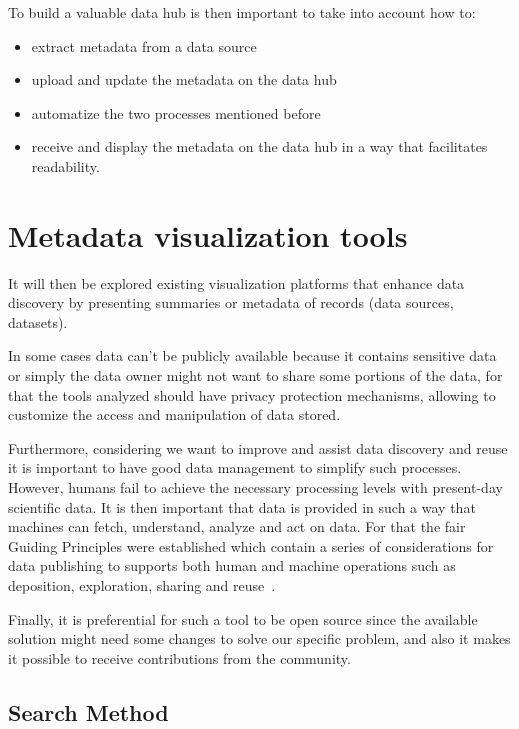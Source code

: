 To build a valuable data hub is then important to take into account how to:
\begin{itemize}
    \item extract metadata from a data source
    \item upload and update the metadata on the data hub
    \item automatize the two processes mentioned before
    \item receive and display the metadata on the data hub in a way that facilitates
        readability.
\end{itemize}

\section{Metadata visualization tools}
%
%


It will then be explored existing visualization platforms that enhance data discovery
by presenting summaries or metadata of records (data sources, datasets).

In some cases data can't be publicly available because it contains sensitive data or
simply the data owner might not want to share some portions of the data, for that the
tools analyzed should have privacy protection mechanisms, allowing to customize the
access and manipulation of data stored.

Furthermore, considering we want to improve and assist data discovery and reuse it is
important to have good data management to simplify such processes.
However, humans fail to achieve the necessary processing levels with present-day
scientific data.
It is then important that data is provided in such a way that machines can fetch,
understand, analyze and act on data.
For that the \gls{fair} Guiding Principles were established which contain a series of
considerations for data publishing to supports both human and machine operations such
as deposition, exploration, sharing and reuse~\cite{fair}.

Finally, it is preferential for such a tool to be open source since the available
solution might need some changes to solve our specific problem, and also it makes it
possible to receive contributions from the community.

\subsection{Search Method}


